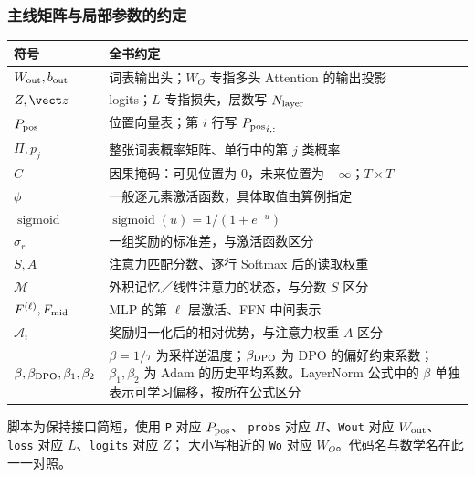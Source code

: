 \subsubsection*{主线矩阵与局部参数的约定}
\begin{center}\small
\renewcommand{\arraystretch}{1.2}
\begin{tabularx}{\linewidth}{@{}p{32mm}X@{}}\toprule
符号 & 全书约定\\\midrule
$W_{\rm out},b_{\rm out}$ & 词表输出头；$W_O$ 专指多头 Attention 的输出投影\\
$Z,\vect z$ & logits；$L$ 专指损失，层数写 $N_{\rm layer}$\\
$P_{\rm pos}$ & 位置向量表；第 $i$ 行写 ${P_{\rm pos}}_{i,:}$\\
$\Pi,p_j$ & 整张词表概率矩阵、单行中的第 $j$ 类概率\\
$C$ & 因果掩码：可见位置为 $0$，未来位置为 $-\infty$；$T\times T$\\
$\phi$ & 一般逐元素激活函数，具体取值由算例指定\\
$\operatorname{sigmoid}$ & $\operatorname{sigmoid}(u)=1/(1+e^{-u})$\\
$\sigma_r$ & 一组奖励的标准差，与激活函数区分\\
$S,A$ & 注意力匹配分数、逐行 Softmax 后的读取权重\\
$\mathcal{M}$ & 外积记忆／线性注意力的状态，与分数 $S$ 区分\\
$F^{(\ell)},F_{\rm mid}$ & MLP 的第 $\ell$ 层激活、FFN 中间表示\\
$\mathcal A_i$ & 奖励归一化后的相对优势，与注意力权重 $A$ 区分\\
$\beta,\beta_{\rm DPO},\beta_1,\beta_2$ & $\beta=1/\tau$ 为采样逆温度；$\beta_{\rm DPO}$ 为 DPO 的偏好约束系数；$\beta_1,\beta_2$ 为 Adam 的历史平均系数。LayerNorm 公式中的 $\beta$ 单独表示可学习偏移，按所在公式区分\\
\bottomrule\end{tabularx}
\end{center}
脚本为保持接口简短，使用 \texttt{P} 对应 $P_{\rm pos}$、
\texttt{probs} 对应 $\Pi$、\texttt{Wout} 对应 $W_{\rm out}$、
\texttt{loss} 对应 $L$、\texttt{logits} 对应 $Z$；
大小写相近的 \texttt{Wo} 对应 $W_O$。代码名与数学名在此一一对照。


